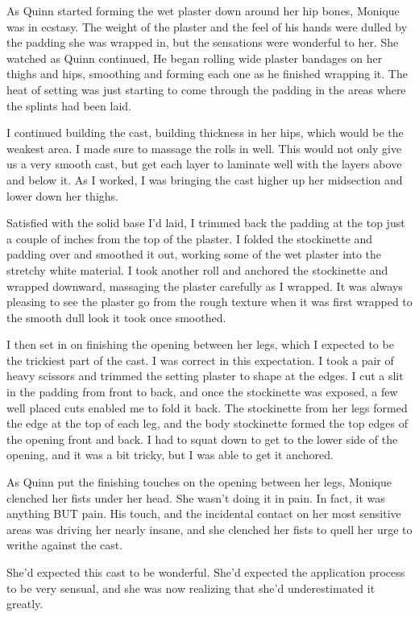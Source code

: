 \begin{thought}
As Quinn started forming the wet plaster down around her hip bones, Monique was in ecstasy.
The weight of the plaster and the feel of his hands were dulled by the padding she was wrapped
in, but the sensations were wonderful to her. She watched as Quinn continued, He began rolling
wide plaster bandages on her thighs and hips, smoothing and forming each one as he finished
wrapping it. The heat of setting was just starting to come through the padding in the areas
where the splints had been laid.
\end{thought}

I continued building the cast, building thickness in her hips, which would be the weakest
area. I made sure to massage the rolls in well. This would not only give us a very smooth cast,
but get each layer to laminate well with the layers above and below it. As I worked, I was
bringing the cast higher up her midsection and lower down her thighs.

Satisfied with the solid base I'd laid, I trimmed back the padding at the top just a couple
of inches from the top of the plaster. I folded the stockinette and padding over and smoothed it
out, working some of the wet plaster into the stretchy white material. I took another roll and
anchored the stockinette and wrapped downward, massaging the plaster carefully as I wrapped. It
was always pleasing to see the plaster go from the rough texture when it was first wrapped to
the smooth dull look it took once smoothed.

I then set in on finishing the opening between her legs, which I expected to be the
trickiest part of the cast. I was correct in this expectation. I took a pair of heavy scissors
and trimmed the setting plaster to shape at the edges. I cut a slit in the padding from front to
back, and once the stockinette was exposed, a few well placed cuts enabled me to fold it back.
The stockinette from her legs formed the edge at the top of each leg, and the body stockinette
formed the top edges of the opening front and back. I had to squat down to get to the lower side
of the opening, and it was a bit tricky, but I was able to get it anchored.

\begin{thought}
As Quinn put the finishing touches on the opening between her legs, Monique clenched her
fists under her head. She wasn't doing it in pain. In fact, it was anything BUT pain. His touch,
and the incidental contact on her most sensitive areas was driving her nearly insane, and she
clenched her fists to quell her urge to writhe against the cast.

She'd expected this cast to be wonderful. She'd expected the application process to be very
sensual, and she was now realizing that she'd underestimated it greatly.
\end{thought}

